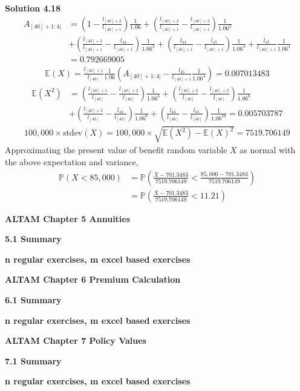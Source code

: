 \documentclass[hidelinks, 12pt]{article}
\theoremstyle{mydefstyle}
\theoremstyle{mythmstyle}
\begin{document}
\textbf{Solution 4.18}
\begin{align*}
A_{[40]+1:4|}
&= \left( 1 - \frac{l_{[40]+2}}{l_{[40]+1}} \right) \frac{1}{1.06}
+ \left( \frac{l_{[40]+2}}{l_{[40]+1}} - \frac{l_{[40]+3}}{l_{[40]+1}} \right) \frac{1}{1.06^2} \\
&+ \left( \frac{l_{[40]+3}}{l_{[40]+1}}  - \frac{l_{44}}{l_{[40]+1}} \right) \frac{1}{1.06^3}
+ \left( \frac{l_{44}}{l_{[40]+1}} - \frac{l_{45}}{l_{[40]+1}} \right) \frac{1}{1.06^4} 
+ \frac{l_{45}}{l_{[40]+1}} \frac{1}{1.06^4} \\
&= 0.792669005
\end{align*}
\begin{gather*}
\mathbb{E}(X) = \frac{l_{[40]+1}}{l_{[40]}} \frac{1}{1.06} \left(A_{[40]+1:4|} - \frac{l_{45}}{l_{[40]+1}} \frac{1}{1.06^4} \right)
= 0.007013483
\end{gather*}
\begin{align*}
\mathbb{E}(X^2)
&= \left( \frac{l_{[40]+1}}{l_{[40]}} - \frac{l_{[40]+2}}{l_{[40]}} \right) \frac{1}{1.06^4}
+ \left( \frac{l_{[40]+2}}{l_{[40]}} - \frac{l_{[40]+3}}{l_{[40]}} \right) \frac{1}{1.06^6} \\
&+ \left( \frac{l_{[40]+3}}{l_{[40]}}  - \frac{l_{44}}{l_{[40]}} \right) \frac{1}{1.06^8}
+ \left( \frac{l_{44}}{l_{[40]}} - \frac{l_{45}}{l_{[40]}} \right) \frac{1}{1.06^{10}}  = 0.005703787
\end{align*}
\begin{gather*}
100,000 \times \mbox{stdev}(X) 
= 100,000 \times \sqrt{\mathbb{E}(X^2) - \mathbb{E}(X)^2} 
= 7519.706149
\end{gather*}
\color{red}
Approximating the present value of benefit random variable $X$ as normal with the above expectation and variance, 
\begin{align*}
\mathbb{P}(X < 85,000)
&= \mathbb{P} \left( \frac{X - 701.3483}{7519.706149} < \frac{85,000 - 701.3483}{7519.706149} \right) \\
&= \mathbb{P} \left( \frac{X - 701.3483}{7519.706149} < 11.21\right)
\end{align*}
\color{black}

\textbf{ALTAM Chapter 5 Annuities}

\textbf{5.1 Summary}

\textbf{n regular exercises, m excel based exercises}

\textbf{ALTAM Chapter 6 Premium Calculation}

\textbf{6.1 Summary}

\textbf{n regular exercises, m excel based exercises}

\textbf{ALTAM Chapter 7 Policy Values}

\textbf{7.1 Summary}

\textbf{n regular exercises, m excel based exercises}
\end{document}

